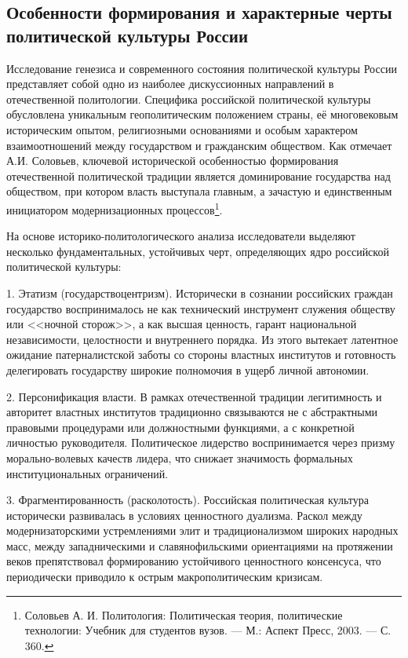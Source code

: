 \subsection{Особенности формирования и характерные черты политической культуры России}

Исследование генезиса и современного состояния политической культуры России представляет собой одно из наиболее дискуссионных направлений в отечественной политологии. Специфика российской политической культуры обусловлена уникальным геополитическим положением страны, её многовековым историческим опытом, религиозными основаниями и особым характером взаимоотношений между государством и гражданским обществом. Как отмечает А.И. Соловьев, ключевой исторической особенностью формирования отечественной политической традиции является доминирование государства над обществом, при котором власть выступала главным, а зачастую и единственным инициатором модернизационных процессов\footnote{Соловьев А. И. Политология: Политическая теория, политические технологии: Учебник для студентов вузов. --- М.: Аспект Пресс, 2003. --- С. 360.}.

На основе историко-политологического анализа исследователи выделяют несколько фундаментальных, устойчивых черт, определяющих ядро российской политической культуры:

1. Этатизм (государствоцентризм). Исторически в сознании российских граждан государство воспринималось не как технический инструмент служения обществу или <<ночной сторож>>, а как высшая ценность, гарант национальной независимости, целостности и внутреннего порядка. Из этого вытекает латентное ожидание патерналистской заботы со стороны властных институтов и готовность делегировать государству широкие полномочия в ущерб личной автономии.

2. Персонификация власти. В рамках отечественной традиции легитимность и авторитет властных институтов традиционно связываются не с абстрактными правовыми процедурами или должностными функциями, а с конкретной личностью руководителя. Политическое лидерство воспринимается через призму морально-волевых качеств лидера, что снижает значимость формальных институциональных ограничений.

3. Фрагментированность (расколотость). Российская политическая культура исторически развивалась в условиях ценностного дуализма. Раскол между модернизаторскими устремлениями элит и традиционализмом широких народных масс, между западническими и славянофильскими ориентациями на протяжении веков препятствовал формированию устойчивого ценностного консенсуса, что периодически приводило к острым макрополитическим кризисам.

